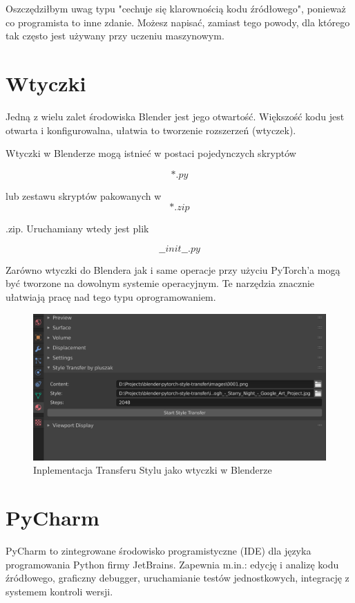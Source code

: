 \documentclass[brudnopis]{xmgr}
\begin{document}
Oszczędziłbym uwag typu "cechuje się klarownością kodu źródłowego", ponieważ co programista to inne zdanie. Możesz napisać, zamiast tego powody, dla którego tak często jest używany przy uczeniu maszynowym.

\section{Wtyczki\label{s:dsssl}}

Jedną z wielu zalet środowiska Blender jest jego otwartość. Większość kodu jest otwarta i konfigurowalna, ułatwia to tworzenie rozszerzeń (wtyczek).



Wtyczki w Blenderze mogą istnieć w postaci pojedynczych skryptów 

\begin{equation}
*.py
\end{equation}

lub zestawu skryptów pakowanych w 
\begin{equation}
*.zip
\end{equation}

.zip. Uruchamiany wtedy jest plik 

\begin{equation}
\_\_init\_\_.py
\end{equation}


Zarówno wtyczki do Blendera jak i same operacje przy użyciu PyTorch’a mogą być tworzone na dowolnym systemie operacyjnym. Te narzędzia znacznie ułatwiają pracę nad tego typu oprogramowaniem.

\begin{figure}[!tbh]
\centering
\includegraphics[width=.8\hsize]{fig/9}
\caption{Inplementacja Transferu Stylu jako wtyczki w Blenderze\label{RYS.9}}
\end{figure}

\section{PyCharm\label{s:dsssl}}
 PyCharm to zintegrowane środowisko programistyczne (IDE) dla języka programowania Python firmy JetBrains. Zapewnia m.in.: edycję i analizę kodu źródłowego, graficzny debugger, uruchamianie testów jednostkowych, integrację z systemem kontroli wersji.
 
\end{document}
